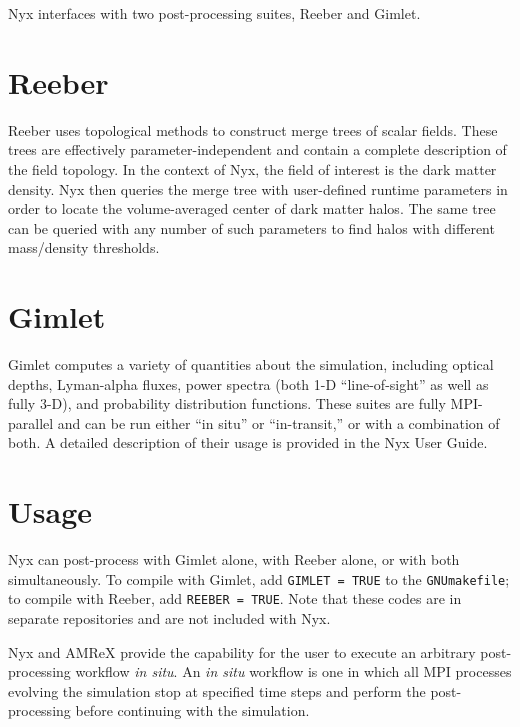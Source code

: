 Nyx interfaces with two post-processing suites, Reeber and Gimlet.

\section{Reeber}

Reeber uses topological methods to construct merge trees of scalar fields.
These trees are effectively parameter-independent and contain a complete
description of the field topology. In the context of Nyx, the field of interest
is the dark matter density. Nyx then queries the merge tree with user-defined
runtime parameters in order to locate the volume-averaged center of dark matter
halos. The same tree can be queried with any number of such parameters to find
halos with different mass/density thresholds.

\section{Gimlet}

Gimlet computes a variety of quantities about the simulation, including optical
depths, Lyman-alpha fluxes, power spectra (both 1-D ``line-of-sight'' as well as
fully 3-D), and probability distribution functions. These suites are fully
MPI-parallel and can be run either ``in situ'' or ``in-transit,'' or with a
combination of both. A detailed description of their usage is provided in the
Nyx User Guide.

\section{Usage}

Nyx can post-process with Gimlet alone, with Reeber alone, or with both
simultaneously. To compile with Gimlet, add \texttt{GIMLET = TRUE} to the
\texttt{GNUmakefile}; to compile with Reeber, add \texttt{REEBER = TRUE}. Note
that these codes are in separate repositories and are not included with Nyx.

Nyx and AMReX provide the capability for the user to execute an arbitrary
post-processing workflow \textit{in situ}. An \textit{in
situ} workflow is one in which all MPI processes evolving the simulation stop
at specified time steps and perform the post-processing before continuing with
the simulation.
